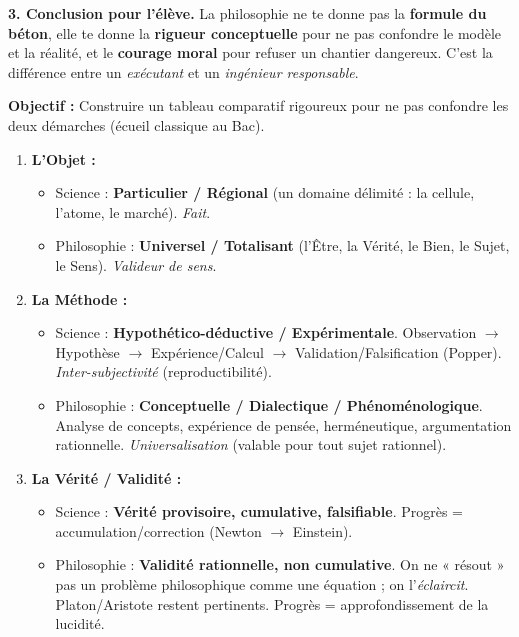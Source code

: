 \documentclass[11pt]{article}
\begin{document}
\begin{exoresolu}
\textbf{3. Conclusion pour l'élève.}
La philosophie ne te donne pas la \textbf{formule du béton}, elle te donne la \textbf{rigueur conceptuelle} pour ne pas confondre le modèle et la réalité, et le \textbf{courage moral} pour refuser un chantier dangereux. C'est la différence entre un \emph{exécutant} et un \emph{ingénieur responsable}.
\end{exoresolu}

\begin{methode}
\textbf{Objectif :} Construire un tableau comparatif rigoureux pour ne pas confondre les deux démarches (écueil classique au Bac).
\begin{enumerate}
    \item \textbf{L'Objet :}
    \begin{itemize}
        \item Science : \textbf{Particulier / Régional} (un domaine délimité : la cellule, l'atome, le marché). \emph{Fait}.
        \item Philosophie : \textbf{Universel / Totalisant} (l'Être, la Vérité, le Bien, le Sujet, le Sens). \emph{Valideur de sens}.
    \end{itemize}
    \item \textbf{La Méthode :}
    \begin{itemize}
        \item Science : \textbf{Hypothético-déductive / Expérimentale}. Observation $\rightarrow$ Hypothèse $\rightarrow$ Expérience/Calcul $\rightarrow$ Validation/Falsification (Popper). \emph{Inter-subjectivité} (reproductibilité).
        \item Philosophie : \textbf{Conceptuelle / Dialectique / Phénoménologique}. Analyse de concepts, expérience de pensée, herméneutique, argumentation rationnelle. \emph{Universalisation} (valable pour tout sujet rationnel).
    \end{itemize}
    \item \textbf{La Vérité / Validité :}
    \begin{itemize}
        \item Science : \textbf{Vérité provisoire, cumulative, falsifiable}. Progrès = accumulation/correction (Newton $\rightarrow$ Einstein).
        \item Philosophie : \textbf{Validité rationnelle, non cumulative}. On ne « résout » pas un problème philosophique comme une équation ; on l'\emph{éclaircit}. Platon/Aristote restent pertinents. Progrès = approfondissement de la lucidité.

\end{itemize}
\end{enumerate}
\end{methode}
\end{document}
